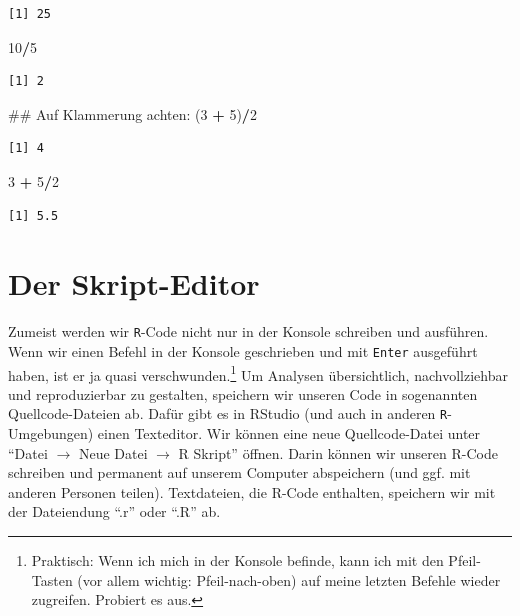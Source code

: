 \documentclass[12pt,]{tufte-book}
\newenvironment{Shaded}{\begin{snugshade}}{\end{snugshade}}
\newcommand{\DecValTok}[1]{\textcolor[rgb]{0.00,0.00,0.81}{#1}}
\newcommand{\StringTok}[1]{\textcolor[rgb]{0.31,0.60,0.02}{#1}}
\newcommand{\OperatorTok}[1]{\textcolor[rgb]{0.81,0.36,0.00}{\textbf{#1}}}
\newcommand{\NormalTok}[1]{#1}
\theoremstyle{definition}
\theoremstyle{definition}
\theoremstyle{definition}
\theoremstyle{remark}
\begin{document}
\begin{verbatim}
[1] 25
\end{verbatim}

\begin{Shaded}
\begin{Highlighting}[]
\DecValTok{10}\OperatorTok{/}\DecValTok{5}
\end{Highlighting}
\end{Shaded}

\begin{verbatim}
[1] 2
\end{verbatim}

\begin{Shaded}
\begin{Highlighting}[]
\NormalTok{## Auf Klammerung achten:}
\NormalTok{(}\DecValTok{3} \OperatorTok{+}\StringTok{ }\DecValTok{5}\NormalTok{)}\OperatorTok{/}\DecValTok{2}
\end{Highlighting}
\end{Shaded}

\begin{verbatim}
[1] 4
\end{verbatim}

\begin{Shaded}
\begin{Highlighting}[]
\DecValTok{3} \OperatorTok{+}\StringTok{ }\DecValTok{5}\OperatorTok{/}\DecValTok{2}
\end{Highlighting}
\end{Shaded}

\begin{verbatim}
[1] 5.5
\end{verbatim}

\section{Der Skript-Editor}\label{der-skript-editor}

Zumeist werden wir \texttt{R}-Code nicht nur in der Konsole schreiben
und ausführen. Wenn wir einen Befehl in der Konsole geschrieben und mit
\texttt{Enter} ausgeführt haben, ist er ja quasi verschwunden.\footnote{Praktisch:
  Wenn ich mich in der Konsole befinde, kann ich mit den Pfeil-Tasten
  (vor allem wichtig: Pfeil-nach-oben) auf meine letzten Befehle wieder
  zugreifen. Probiert es aus.} Um Analysen übersichtlich,
nachvollziehbar und reproduzierbar zu gestalten, speichern wir unseren
Code in sogenannten Quellcode-Dateien ab. Dafür gibt es in RStudio (und
auch in anderen \texttt{R}-Umgebungen) einen Texteditor. Wir können eine
neue Quellcode-Datei unter ``Datei \(\to\) Neue Datei \(\to\) R Skript''
öffnen. Darin können wir unseren R-Code schreiben und permanent auf
unserem Computer abspeichern (und ggf. mit anderen Personen teilen).
Textdateien, die R-Code enthalten, speichern wir mit der Dateiendung
``.r'' oder ``.R'' ab.
\end{document}
